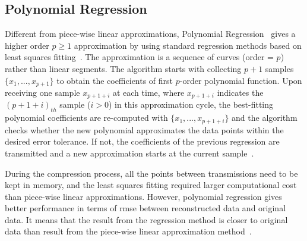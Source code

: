 \subsection{Polynomial Regression}
\label{sec:polynomial}

Different from piece-wise linear approximations, Polynomial
Regression~\cite{zordan2014performance} gives a higher order $p \geqslant1$
approximation by using standard regression methods based on least squares
fitting~\cite{phillips2003interpolation}. The approximation is a sequence of
curves (order = $p$) rather than linear segments. The algorithm starts with
collecting $p+1$ samples $\{x_1, ..., x_{p+1} \}$ to obtain the coefficients of
first $p$-order polynomial function. Upon receiving one sample $x_{p+1+i}$ at
each time, where $x_{p+1+i}$ indicates the $(p+1+i)_{th}$ sample ($i>0$) in this
approximation cycle, the best-fitting polynomial coefficients are re-computed
with $\{ x_1, ..., x_{p+1+i}\}$ and the algorithm checks whether the new
polynomial approximates the data points within the desired error tolerance. If
not, the coefficients of the previous regression are transmitted and a new
approximation starts at the current sample~\cite{zordan2014performance}.

During the compression process, all the points between transmissions need to be
kept in memory, and the least squares fitting required larger computational cost
than piece-wise linear approximations. However, polynomial regression gives
better performance in terms of \acrfull{rmse} between reconstructed data and
original data. It means that the result from the regression method is closer to
original data than result from the piece-wise linear approximation
method~\cite{zordan2014performance}.



